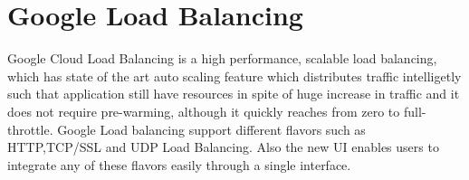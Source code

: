 \section{Google Load Balancing}

Google Cloud Load Balancing is a high performance, scalable load balancing, 
which has state of the art auto scaling feature which distributes traffic 
intelligetly such that application still have resources in spite of huge increase 
in traffic and it does not require pre-warming, although it quickly reaches 
from zero to full-throttle. 
Google Load balancing support different flavors such as HTTP,TCP/SSL and UDP 
Load Balancing. Also the new UI enables users to integrate any of these flavors 
easily through a single interface.\cite{hid-sp18-602-loadbalancing-main} 

